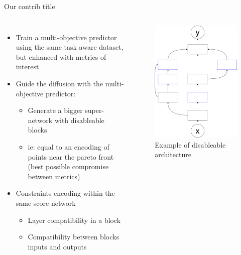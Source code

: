 \documentclass[aspectratio=169,xcolor=dvipsnames]{beamer}
\begin{document}
\begin{frame}{Our contrib title}
    \begin{columns}[c]
        \begin{itemize}
            \item Train a multi-objective predictor using the same task aware dataset, but enhanced with metrics of interest
            \item Guide the diffusion with the multi-objective predictor:
                \begin{itemize}
                    \item Generate a bigger super-network with disableable blocks
                    \item ie: equal to an encoding of points near the pareto front (best possible compromise between metrics)
                \end{itemize}
            \item Constraints encoding within the same score network
                \begin{itemize}
                    \item Layer compatibility in a block
                    \item Compatibility between blocks inputs and outputs
                \end{itemize}
        \end{itemize}

        \begin{figure}[htbp]
            \centering
            \includegraphics[width=.7\textwidth]{diagram.drawio.png}
            \caption{Example of disableable architecture}
        \end{figure}
    \end{columns}
\end{frame}
\end{document}
